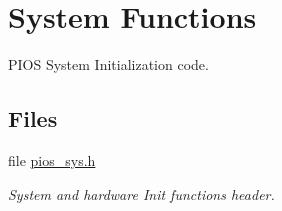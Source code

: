 \hypertarget{group___p_i_o_s___s_y_s}{\section{\-System \-Functions}
\label{group___p_i_o_s___s_y_s}
}


\-P\-I\-O\-S \-System \-Initialization code.  


\subsection*{\-Files}
\begin{DoxyCompactItemize}
\item 
file \hyperlink{pios__sys_8h}{pios\-\_\-sys.\-h}
\begin{DoxyCompactList}\small\item\em \-System and hardware \-Init functions header. \end{DoxyCompactList}\end{DoxyCompactItemize}
